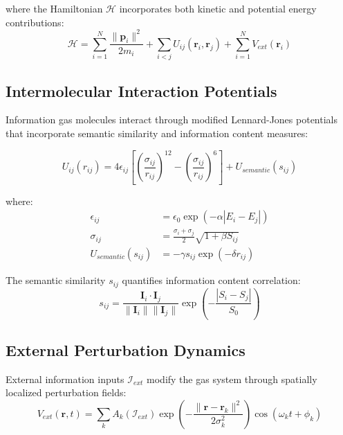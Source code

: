 \documentclass[11pt,a4paper]{article}
\begin{document}
where the Hamiltonian $\mathcal{H}$ incorporates both kinetic and potential energy contributions:
\begin{equation}
\mathcal{H} = \sum_{i=1}^{N} \frac{\|\mathbf{p}_i\|^2}{2m_i} + \sum_{i<j} U_{ij}(\mathbf{r}_i, \mathbf{r}_j) + \sum_{i=1}^{N} V_{ext}(\mathbf{r}_i)
\label{eq:hamiltonian}
\end{equation}

\subsection{Intermolecular Interaction Potentials}

Information gas molecules interact through modified Lennard-Jones potentials that incorporate semantic similarity and information content measures:

\begin{equation}
U_{ij}(r_{ij}) = 4\epsilon_{ij}\left[\left(\frac{\sigma_{ij}}{r_{ij}}\right)^{12} - \left(\frac{\sigma_{ij}}{r_{ij}}\right)^6\right] + U_{semantic}(s_{ij})
\label{eq:interaction-potential}
\end{equation}

where:
\begin{align}
\epsilon_{ij} &= \epsilon_0 \exp(-\alpha |E_i - E_j|) \label{eq:epsilon-modulation} \\
\sigma_{ij} &= \frac{\sigma_i + \sigma_j}{2} \sqrt{1 + \beta S_{ij}} \label{eq:sigma-modulation} \\
U_{semantic}(s_{ij}) &= -\gamma s_{ij} \exp(-\delta r_{ij}) \label{eq:semantic-potential}
\end{align}

The semantic similarity $s_{ij}$ quantifies information content correlation:
\begin{equation}
s_{ij} = \frac{\mathbf{I}_i \cdot \mathbf{I}_j}{\|\mathbf{I}_i\| \|\mathbf{I}_j\|} \exp\left(-\frac{|S_i - S_j|}{S_0}\right)
\label{eq:semantic-similarity}
\end{equation}

\subsection{External Perturbation Dynamics}

External information inputs $\mathcal{I}_{ext}$ modify the gas system through spatially localized perturbation fields:
\begin{equation}
V_{ext}(\mathbf{r}, t) = \sum_{k} A_k(\mathcal{I}_{ext}) \exp\left(-\frac{\|\mathbf{r} - \mathbf{r}_k\|^2}{2\sigma_k^2}\right) \cos(\omega_k t + \phi_k)
\label{eq:external-perturbation}
\end{equation}
\end{document}
